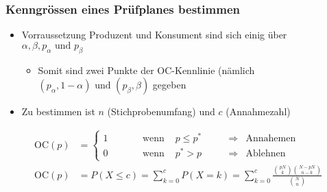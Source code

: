 \subsubsection{Kenngrössen eines Prüfplanes bestimmen}
\begin{itemize}
	\item Vorraussetzung Produzent und Konsument sind sich einig über $\alpha, \beta, p_\alpha \text{ und } p_\beta$
	\begin{itemize}
		\item Somit sind zwei Punkte der OC-Kennlinie (nämlich $(p_\alpha,1-\alpha) \text{ und } (p_\beta,\beta)$ gegeben
	\end{itemize}
	\item Zu bestimmen ist $n$ (Stichprobenumfang) und $c$ (Annahmezahl)
\end{itemize}

\begin{align}
	\label{eq:OC}
	\text{OC}(p) &= \left\lbrace \begin{matrix}
		1 & \qquad &\text{wenn } &p\leq p^\ast \qquad &\Rightarrow &\text{Annahemen}\\
		0 & \qquad &\text{wenn } &p^\ast> p 	\qquad &\Rightarrow &\text{Ablehnen}
	\end{matrix}\right.\\
	\label{eq:OCp}
	\text{OC}(p) &= P(X\leq c) = \sum_{k=0}^{c}P(X=k) = \sum_{k=0}^{c}\frac{\binom{pN}{k}\binom{N-pN}{n-k}}{\binom{N}{n}}
\end{align}

\clearpage